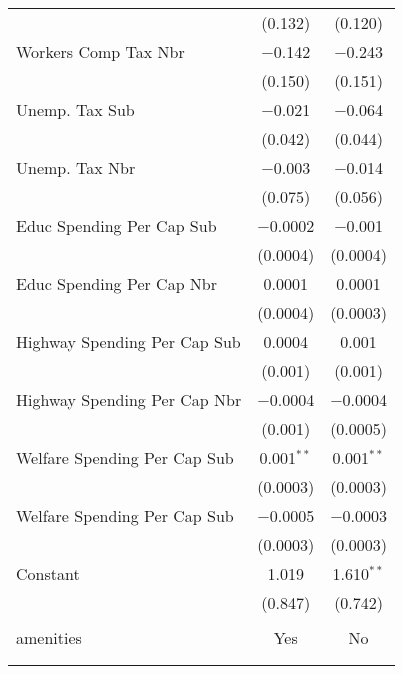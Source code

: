 \begin{table}[!htbp]
\begin{tabular}{@{\extracolsep{5pt}}lcc}
  & (0.132) & (0.120) \\ 
  Workers Comp Tax Nbr & $-$0.142 & $-$0.243 \\ 
  & (0.150) & (0.151) \\ 
  Unemp. Tax Sub & $-$0.021 & $-$0.064 \\ 
  & (0.042) & (0.044) \\ 
  Unemp. Tax Nbr & $-$0.003 & $-$0.014 \\ 
  & (0.075) & (0.056) \\ 
  Educ Spending Per Cap Sub & $-$0.0002 & $-$0.001 \\ 
  & (0.0004) & (0.0004) \\ 
  Educ Spending Per Cap Nbr & 0.0001 & 0.0001 \\ 
  & (0.0004) & (0.0003) \\ 
  Highway Spending Per Cap Sub & 0.0004 & 0.001 \\ 
  & (0.001) & (0.001) \\ 
  Highway Spending Per Cap Nbr & $-$0.0004 & $-$0.0004 \\ 
  & (0.001) & (0.0005) \\ 
  Welfare Spending Per Cap Sub & 0.001$^{**}$ & 0.001$^{**}$ \\ 
  & (0.0003) & (0.0003) \\ 
  Welfare Spending Per Cap Sub & $-$0.0005 & $-$0.0003 \\ 
  & (0.0003) & (0.0003) \\ 
  Constant & 1.019 & 1.610$^{**}$ \\ 
  & (0.847) & (0.742) \\ 
 \hline \\[-1.8ex] 
amenities & Yes & No \\ 
\hline \\[-1.8ex] 
\hline 
\hline \\[-1.8ex] 
\end{tabular} 
\end{table} 
